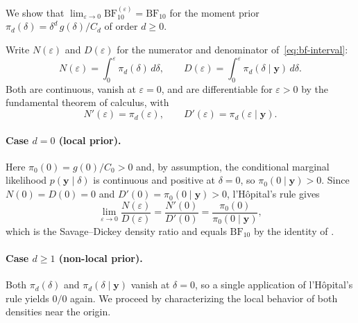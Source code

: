 \documentclass{article}
\begin{document}
We show that
$\lim_{\varepsilon\to 0}
  \mathrm{BF}_{10}^{(\varepsilon)} = \mathrm{BF}_{10}$
for the moment prior $\pi_d(\delta)=\delta^d\,g(\delta)/C_d$
of order $d\ge 0$.
 
Write $N(\varepsilon)$ and $D(\varepsilon)$ for the numerator and
denominator of~\eqref{eq:bf-interval}:
\[
N(\varepsilon) = \int_0^{\varepsilon}\pi_d(\delta)\,d\delta,
\qquad
D(\varepsilon) = \int_0^{\varepsilon}\pi_d(\delta\mid\mathbf{y})
  \,d\delta.
\]
Both are continuous, vanish at $\varepsilon=0$, and are
differentiable for $\varepsilon>0$ by the fundamental theorem of
calculus, with
\[
N'(\varepsilon) = \pi_d(\varepsilon), \qquad
D'(\varepsilon) = \pi_d(\varepsilon\mid\mathbf{y}).
\]
 
\paragraph{Case $d=0$ (local prior).}
Here $\pi_0(0)=g(0)/C_0>0$ and, by assumption, the conditional
marginal likelihood $p(\mathbf{y}\mid\delta)$ is continuous and
positive at $\delta=0$, so
$\pi_0(0\mid\mathbf{y})>0$.
Since $N(0)=D(0)=0$ and $D'(0)=\pi_0(0\mid\mathbf{y})>0$,
l'H\^opital's rule gives
\[
\lim_{\varepsilon\to 0}
  \frac{N(\varepsilon)}{D(\varepsilon)}
= \frac{N'(0)}{D'(0)}
= \frac{\pi_0(0)}{\pi_0(0\mid\mathbf{y})},
\]
which is the Savage--Dickey density ratio and equals
$\mathrm{BF}_{10}$ by the identity of
\textcite{Dickey1971, verdinelli1995}.
 
\paragraph{Case $d\ge 1$ (non-local prior).}
Both $\pi_d(\delta)$ and $\pi_d(\delta\mid\mathbf{y})$ vanish at
$\delta=0$, so a single application of l'H\^opital's rule yields
$0/0$ again.
We proceed by characterizing the local behavior of both densities
near the origin.
 
\end{document}

